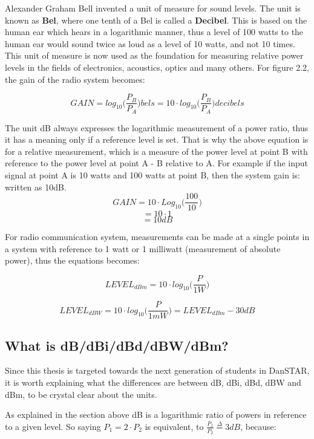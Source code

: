 Alexander Graham Bell invented a unit of measure for sound levels. The unit is known as \textbf{Bel}, where one tenth of a Bel is called a \textbf{Decibel}. This is based on the human ear which hears in a logarithmic manner, thus a level of 100 watts to the human ear would sound twice as loud as a level of 10 watts, and not 10 times. This unit of measure is now used as the foundation for measuring relative power levels in the fields of electronics, acoustics, optics and many others. For figure 2.2, the gain of the radio system becomes: 

\begin{equation}
    GAIN = log_{10}\Big(\frac{P_B}{P_A}\Big)bels = 10 \cdot log_{10}\Big(\frac{P_B}{P_A}\Big)decibels
\end{equation}

The unit dB always expresses the logarithmic measurement of a power ratio, thus it has a meaning only if a reference level is set. That is why the above equation is for a relative measurement, which is a measure of the power level at point B with reference to the power level at point A - B relative to A. For example if the input signal at point A is 10 watts and 100 watts at point B, then the system gain is: written as 10dB. 
$$GAIN = 10 \cdot Log_{10}\Big(\frac{100}{10}\Big)$$
$$= 10 \cdot 1$$
$$= 10dB$$

For radio communication system, measurements can be made at a single points in a system with reference to 1 watt or 1 milliwatt (measurement of absolute power), thus the equations becomes:

\begin{equation}
    LEVEL_{dBm} = 10 \cdot log_{10}\Big(\frac{P}{1W}\Big)
\end{equation}

\begin{equation}
    LEVEL_{dBW} = 10 \cdot log_{10}\Big(\frac{P}{1mW}\Big) = LEVEL_{dBm}-30dB
\end{equation}

\subsection{What is dB/dBi/dBd/dBW/dBm?}
Since this thesis is targeted towards the next generation of students in DanSTAR, it is worth explaining what the differences are between dB, dBi, dBd, dBW and dBm, to be crystal clear about the units. 

As explained in the section above dB is a logarithmic ratio of powers in reference to a given level. So saying $P_1 = 2 \cdot P_2$ is equivalent, to $\frac{P_1}{P_2}\overset{\Delta}{=} 3 dB$, because: 

